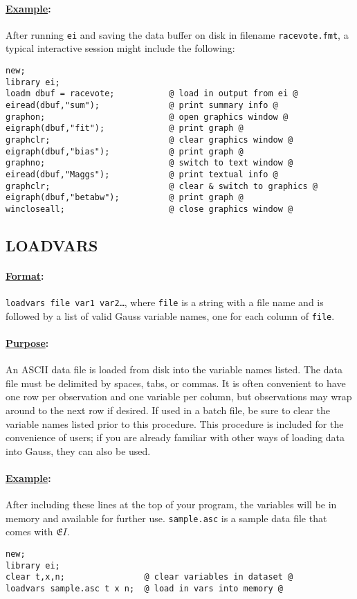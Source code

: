 \documentclass[11pt,titlepage]{article}
\newcommand{\EI}{\ensuremath{{\mathfrak EI}}}
\begin{document}
\paragraph{\underline{Example}:} After running \texttt{ei} and
saving the data buffer on disk in filename \texttt{racevote.fmt}, a
typical interactive session might include the following:
\begin{verbatim}
new;
library ei;
loadm dbuf = racevote;           @ load in output from ei @
eiread(dbuf,"sum");              @ print summary info @
graphon;                         @ open graphics window @
eigraph(dbuf,"fit");             @ print graph @
graphclr;                        @ clear graphics window @
eigraph(dbuf,"bias");            @ print graph @
graphno;                         @ switch to text window @
eiread(dbuf,"Maggs");            @ print textual info @
graphclr;                        @ clear & switch to graphics @
eigraph(dbuf,"betabw");          @ print graph @
wincloseall;                     @ close graphics window @
\end{verbatim}

\subsection{LOADVARS}  \label{loadvars}

\paragraph{\underline{Format}:} \texttt{loadvars file var1
  var2\ldots}, where \texttt{file} is a string with a file name and is
followed by a list of valid Gauss variable names, one for each column
of \texttt{file}.

\paragraph{\underline{Purpose}:}
An ASCII data file is loaded from disk into the variable names listed.
The data file must be delimited by spaces, tabs, or commas.  It is
often convenient to have one row per observation and one variable per
column, but observations may wrap around to the next row if desired.
If used in a batch file, be sure to clear the variable names listed
prior to this procedure.  This procedure is included for the
convenience of users; if you are already familiar with other ways of
loading data into Gauss, they can also be used.

\paragraph{\underline{Example}:}
After including these lines at the top of your program, the variables
will be in memory and available for further use.  \texttt{sample.asc}
is a sample data file that comes with \EI.
\begin{verbatim}
new;
library ei;
clear t,x,n;                @ clear variables in dataset @
loadvars sample.asc t x n;  @ load in vars into memory @
\end{verbatim}
\end{document}

